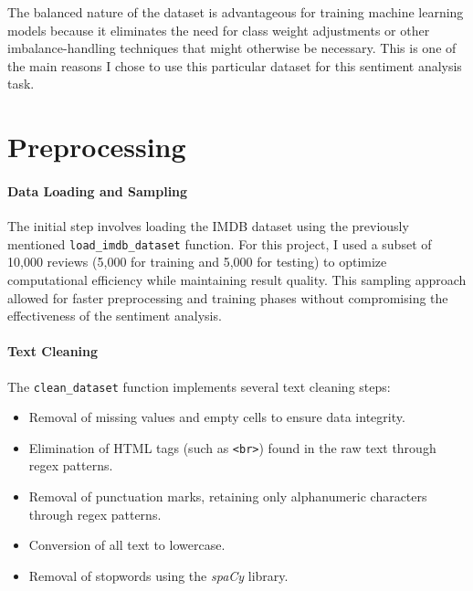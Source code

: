 \documentclass[12pt]{article}
\begin{document}
The balanced nature of the dataset is advantageous for training machine learning models because it eliminates the need for class weight adjustments or other imbalance-handling techniques that might otherwise be necessary. This is one of the main reasons I chose to use this particular dataset for this sentiment analysis task.





\section{Preprocessing}
\paragraph{Data Loading and Sampling}
The initial step involves loading the IMDB dataset using the previously mentioned \texttt{load\_imdb\_dataset} function. For this project, I used a subset of 10,000 reviews (5,000 for training and 5,000 for testing) to optimize computational efficiency while maintaining result quality. This sampling approach allowed for faster preprocessing and training phases without compromising the effectiveness of the sentiment analysis.

\paragraph{Text Cleaning}
The \texttt{clean\_dataset} function implements several text cleaning steps:
\begin{itemize}
    \item Removal of missing values and empty cells to ensure data integrity.
    \item Elimination of HTML tags (such as \texttt{<br>}) found in the raw text through regex patterns.
    \item Removal of punctuation marks, retaining only alphanumeric characters through regex patterns.
    \item Conversion of all text to lowercase.
    \item Removal of stopwords using the \textit{spaCy} library.
\end{itemize}
\end{document}
